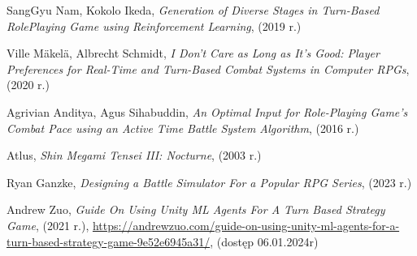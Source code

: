 \documentclass{SGGW-thesis}
\begin{document}
\begin{thebibliography}{9}
  SangGyu Nam, Kokolo Ikeda,
  \textit{Generation of Diverse Stages in Turn-Based RolePlaying Game using Reinforcement Learning},
  (2019 r.)

  Ville Mäkelä, Albrecht Schmidt,
  \textit{I Don’t Care as Long as It’s Good: Player Preferences for
  Real-Time and Turn-Based Combat Systems in Computer RPGs},
  (2020 r.)

  Agrivian Anditya, Agus Sihabuddin,
  \textit{An Optimal Input for Role-Playing Game’s
  Combat Pace using an Active Time Battle System
  Algorithm},
  (2016 r.)

  Atlus,
  \textit{Shin Megami Tensei III: Nocturne},
  (2003 r.)

  Ryan Ganzke,
  \textit{Designing a Battle Simulator For a Popular RPG Series},
  (2023 r.)

  Andrew Zuo,
  \textit{Guide On Using Unity ML Agents For A Turn Based Strategy Game},
  (2021 r.),
  \url{https://andrewzuo.com/guide-on-using-unity-ml-agents-for-a-turn-based-strategy-game-9e52e6945a31/},
  (dostęp 06.01.2024r)
\end{thebibliography}

\beforelastpage
\end{document}
